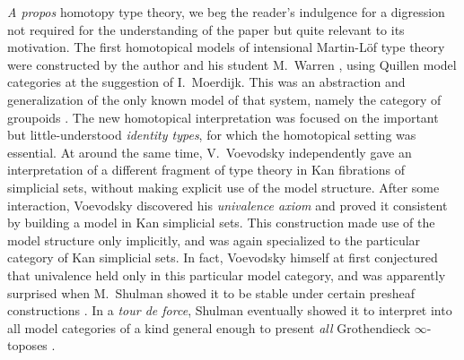 \documentclass[11pt]{amsart}
\theoremstyle{remark}
\theoremstyle{definition}
\begin{document}
\emph{A propos} homotopy type theory, we beg the reader's indulgence for a digression not required for the understanding of the paper but quite relevant to its motivation.  The first homotopical models of intensional Martin-L\"of type theory were constructed by the author and his student M.\ Warren \cite{AW}, using Quillen model categories at the suggestion of I.\ Moerdijk.  This was an abstraction and generalization of the only known model of that system, namely the category of groupoids \cite{HS}.  The new homotopical interpretation was focused on the important but little-understood \emph{identity types}, for which the homotopical setting was essential.    At around the same time, V.~Voevodsky independently gave an interpretation of a different fragment of type theory in Kan fibrations of simplicial sets, without making explicit use of the model structure.  After some interaction, Voevodsky discovered his \emph{univalence axiom} and proved it consistent by building a model in Kan simplicial sets.  This construction made use of the model structure only implicitly, and was again specialized to the particular category of Kan simplicial sets.  In fact, Voevodsky himself at first conjectured that univalence held only in this particular model category, and was apparently surprised when M.~Shulman showed it to be stable under certain presheaf constructions \cite{Shu1}. In a \emph{tour de force}, Shulman eventually showed it to interpret into all model categories of a kind general enough to present \emph{all} Grothendieck $\infty$-toposes \cite{Shulman}.
\end{document}
